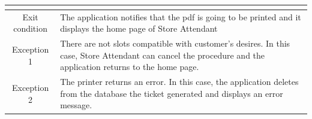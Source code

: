 \documentclass[table, 12pt]{article}
\begin{document}
\begin{longtable}{|c| p{10cm}|}
\begin{itemize}[nosep,after=\strut]
    \end{itemize}                                                                                                                                   \\
    \hline
    Exit condition   & The application notifies that the pdf is going to be printed and it displays the home page of Store Attendant
    \\
    \hline
    \hline
    Exception 1      & There are not slots compatible with customer's desires. In this case, Store Attendant can cancel the procedure and the application returns to the home page. \\
    \hline
    Exception 2      & The printer returns an error. In this case, the application deletes from the database the ticket generated and displays an error message.                    \\
    \hline
\end{longtable}
\end{document}
